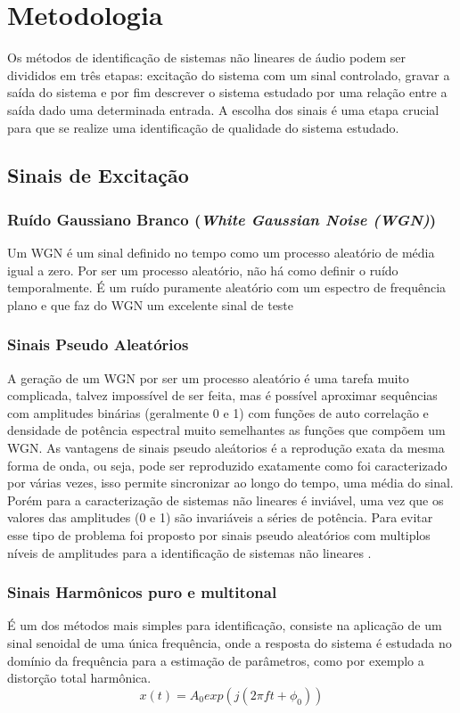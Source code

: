 \chapter{Metodologia} \label{cap3}
Os métodos de identificação de sistemas não lineares de áudio podem ser divididos em três etapas: excitação do sistema com um sinal controlado, gravar a saída do sistema e por fim descrever o sistema estudado por uma relação entre a saída dado uma determinada entrada. A escolha dos sinais é uma etapa crucial para que se realize uma identificação de qualidade do sistema estudado\cite{novakdissertation}.

\section{Sinais de Excitação}
\subsection*{Ruído Gaussiano Branco (\textit{White Gaussian Noise (WGN)})}
Um WGN é um sinal definido no tempo como um processo aleatório de média igual a zero. Por ser um processo aleatório, não há como definir o ruído temporalmente. É um ruído puramente aleatório com um espectro de frequência plano e que faz do WGN um excelente sinal de teste \cite{novakdissertation}

\subsection*{Sinais Pseudo Aleatórios}
A geração de um WGN por ser um processo aleatório é uma tarefa muito complicada, talvez impossível de ser feita, mas é possível aproximar sequências com amplitudes binárias (geralmente 0 e 1) com funções de auto correlação e densidade de potência espectral muito semelhantes as funções que compõem um WGN. As vantagens de sinais pseudo aleátorios é a reprodução exata da mesma forma de onda, ou seja, pode ser reproduzido exatamente como foi caracterizado por várias vezes, isso permite sincronizar ao longo do tempo, uma média do sinal. Porém para a caracterização de sistemas não lineares é inviável, uma vez que os valores das amplitudes (0 e 1) são invariáveis a séries de potência. Para evitar esse tipo de problema foi proposto por \cite{haber1999nonlinear} sinais pseudo aleatórios com multiplos níveis de amplitudes para a identificação de sistemas não lineares \cite{novakdissertation}.

\subsection*{Sinais Harmônicos puro e multitonal}
É um dos métodos mais simples para identificação, consiste na aplicação de um sinal senoidal de uma única frequência, onde a resposta do sistema é estudada no domínio da frequência para a estimação de parâmetros, como por exemplo a distorção total harmônica.
\begin{equation}
x(t) = A_{0} exp(j (2\pi f t + \phi_{0}))
\end{equation}

